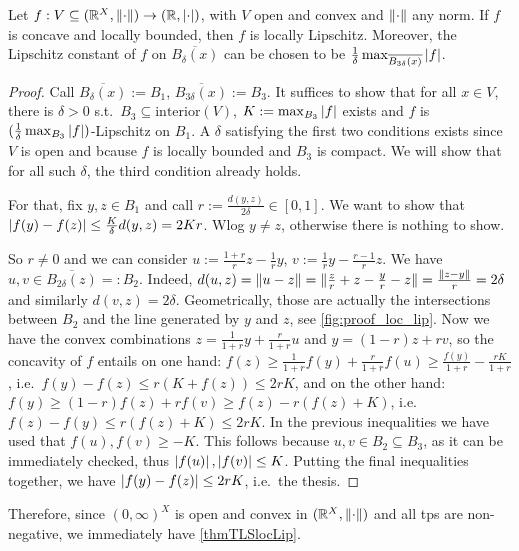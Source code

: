 \begin{theorem}\label{th:locLip}
Let $f:V\subseteq (\mathbb{R}^X,\lVert\cdot\rVert) \to (\mathbb{R},\left\lvert\cdot\right\rvert)$, with $V$ open and convex and $\lVert\cdot\rVert$ any norm.
If $f$ is concave and locally bounded, then $f$ is locally Lipschitz.
Moreover, the Lipschitz constant of $f$ on $\overline{B_{\delta}(x)}$ can be chosen to be $\frac{1}{\delta}\max_{\overline{B_{3\delta}(x)}} \left\lvert f\right\rvert$.
\end{theorem}
\begin{proof}
 Call $\overline{B_{\delta}(x)}:=B_1$, $\overline{B_{3\delta}(x)}:=B_3$.
 It suffices to show that for all $x\in V$, there is $\delta>0$ s.t.\ $B_3\subseteq \mathrm{interior}(V)$, $K:=\max_{B_3}  \left\lvert f\right\rvert$ exists and $f$ is $(\frac{1}{\delta}\max_{B_3} \left\lvert f\right\rvert)$-Lipschitz on $B_1$.
 A $\delta$ satisfying the first two conditions exists since $V$ is open and bcause $f$ is locally bounded and $B_3$ is compact.
 We will show that for all such $\delta$, the third condition already holds.

 For that, fix $y,z\in B_1$ and call $r:=\frac{d(y,z)}{2\delta}\in[0,1]$.
 We want to show that $\left\lvert f(y)-f(z)\right\rvert\leq \frac{K}{\delta}d(y,z)=2Kr$.
 Wlog $y\neq z$, otherwise there is nothing to show.

 So $r\neq 0$ and we can consider $u:=\frac{1+r}{r}z-\frac{1}{r}y$, $v:=\frac{1}{r}y-\frac{r-1}{r}z$.
 We have $u,v\in \overline{B_{2\delta}(z)}=:B_2$.
 Indeed, $d(u,z)=\lVert u-z\rVert=\lVert\frac{z}{r}+z-\frac{y}{r}-z\rVert=\frac{\lVert z-y\rVert}{r}=2\delta$ and similarly $d(v,z)=2\delta$.
 Geometrically, those are actually the intersections between $B_2$ and the line generated by $y$ and $z$, see \autoref{fig:proof_loc_lip}.
 Now we have the convex combinations $z=\frac{1}{1+r}y+\frac{r}{1+r}u$ and $y=(1-r)z+rv$, so the concavity of $f$ entails on one hand:
 $f(z)\geq \frac{1}{1+r}f(y)+\frac{r}{1+r}f(u)\geq \frac{f(y)}{1+r} - \frac{rK}{1+r}$, i.e.\ $f(y)-f(z)\leq r(K+f(z))\leq 2rK$, and on the other hand:
 $f(y)\geq (1-r)f(z)+rf(v)\geq f(z)-r(f(z)+K)$, i.e.\ $f(z)-f(y)\leq r(f(z)+K)\leq 2rK$.
 In the previous inequalities we have used that $f(u),f(v)\geq -K$.
 This follows because $u,v\in B_2\subseteq B_3$, as it can be immediately checked, thus $\left\lvert f(u)\right\rvert,\left\lvert f(v)\right\rvert\leq K$.
 Putting the final inequalities together, we have $\left\lvert f(y)-f(z)\right\rvert\leq 2rK$, i.e.\ the thesis.
\end{proof}

Therefore, since $(0,\infty)^X$ is open and convex in $(\mathbb{R}^X,\lVert\cdot\rVert)$ and all tps are non-negative, we immediately have \autoref{thmTLSlocLip}.
